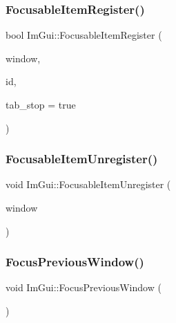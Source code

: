 \subsubsection{\texorpdfstring{Focusable\+Item\+Register()}{FocusableItemRegister()}}
{\footnotesize\ttfamily bool Im\+Gui\+::\+Focusable\+Item\+Register (\begin{DoxyParamCaption}\item[{\hyperlink{struct_im_gui_window}{Im\+Gui\+Window} $\ast$}]{window,  }\item[{Im\+Gui\+ID}]{id,  }\item[{bool}]{tab\+\_\+stop = {\ttfamily true} }\end{DoxyParamCaption})}

\hypertarget{namespace_im_gui_a390518fcaef04b4d399d2475d4d84df7}{}\label{namespace_im_gui_a390518fcaef04b4d399d2475d4d84df7} 
\subsubsection{\texorpdfstring{Focusable\+Item\+Unregister()}{FocusableItemUnregister()}}
{\footnotesize\ttfamily void Im\+Gui\+::\+Focusable\+Item\+Unregister (\begin{DoxyParamCaption}\item[{\hyperlink{struct_im_gui_window}{Im\+Gui\+Window} $\ast$}]{window }\end{DoxyParamCaption})}

\hypertarget{namespace_im_gui_a71f3fa3da1f6e029fb324d1d41fee0ad}{}\label{namespace_im_gui_a71f3fa3da1f6e029fb324d1d41fee0ad} 
\subsubsection{\texorpdfstring{Focus\+Previous\+Window()}{FocusPreviousWindow()}}
{\footnotesize\ttfamily void Im\+Gui\+::\+Focus\+Previous\+Window (\begin{DoxyParamCaption}{ }\end{DoxyParamCaption})\hspace{0.3cm}{\ttfamily [static]}}

\hypertarget{namespace_im_gui_ade4c08e7e7ad7bbfa4835248f5f3a7c6}{}\label{namespace_im_gui_ade4c08e7e7ad7bbfa4835248f5f3a7c6} 
